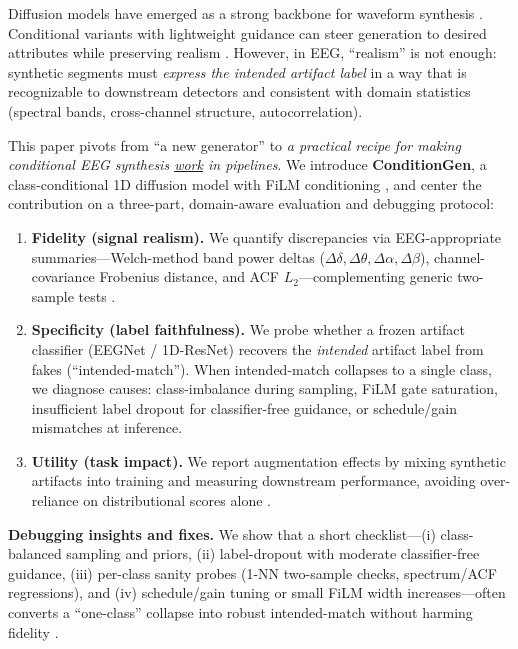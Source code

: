 \documentclass{article}
\begin{document}
Diffusion models have emerged as a strong backbone for waveform synthesis \citep{ho2020ddpm,song2020sde,kong2020diffwave,chen2020wavegrad}. Conditional variants with lightweight guidance can steer generation to desired attributes while preserving realism \citep{ho2022cfg}. However, in EEG, “realism” is not enough: synthetic segments must \emph{express the intended artifact label} in a way that is recognizable to downstream detectors and consistent with domain statistics (spectral bands, cross-channel structure, autocorrelation).

This paper pivots from “a new generator” to \emph{a practical recipe for making conditional EEG synthesis \underline{work} in pipelines}. We introduce \textbf{ConditionGen}, a class-conditional 1D diffusion model with FiLM conditioning \citep{perez2018film}, and center the contribution on a three-part, domain-aware evaluation and debugging protocol:

\begin{enumerate}
\item \textbf{Fidelity (signal realism).} We quantify discrepancies via EEG-appropriate summaries—Welch-method band power deltas (\(\Delta\delta,\Delta\theta,\Delta\alpha,\Delta\beta\)), channel-covariance Frobenius distance, and ACF \(L_2\)—complementing generic two-sample tests \citep{welch1967psd,gretton2012mmd}.
\item \textbf{Specificity (label faithfulness).} We probe whether a frozen artifact classifier (EEGNet / 1D-ResNet) recovers the \emph{intended} artifact label from fakes (``intended-match''). When intended-match collapses to a single class, we diagnose causes: class-imbalance during sampling, FiLM gate saturation, insufficient label dropout for classifier-free guidance, or schedule/gain mismatches at inference.
\item \textbf{Utility (task impact).} We report augmentation effects by mixing synthetic artifacts into training and measuring downstream performance, avoiding over-reliance on distributional scores alone \citep{sajjadi2018prd}.
\end{enumerate}

\textbf{Debugging insights and fixes.} We show that a short checklist—(i) class-balanced sampling and priors, (ii) label-dropout with moderate classifier-free guidance, (iii) per-class sanity probes (1-NN two-sample checks, spectrum/ACF regressions), and (iv) schedule/gain tuning or small FiLM width increases—often converts a “one-class” collapse into robust intended-match without harming fidelity \citep{lopezpaz2017c2st,ho2022cfg}. 
\end{document}

